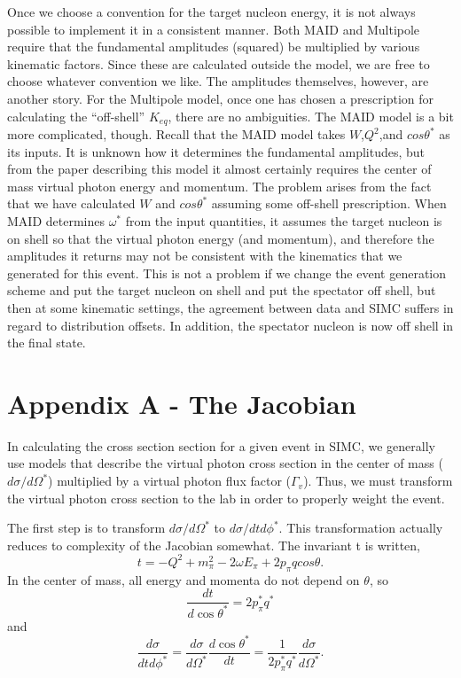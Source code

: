 Once we choose a convention for the target nucleon energy, it is not always 
possible to implement it in a consistent manner.  Both MAID and Multipole
require that the fundamental amplitudes (squared) be multiplied by various
kinematic factors.  Since these are calculated outside the model, we are free
to choose whatever convention we like.  The amplitudes themselves, however,
are another story. 
For the Multipole model, once one has chosen a prescription
for calculating the ``off-shell'' $K_{eq}$, there are no ambiguities.  The 
MAID model is a bit more complicated, though.  Recall that the MAID model 
takes $W$,$Q^2$,and $cos{\theta^*}$ as its inputs.  It is unknown how it 
determines the fundamental amplitudes, but from the paper describing this 
model it almost certainly requires the center of mass virtual photon energy 
and momentum.  The 
problem arises from the fact that we have calculated $W$ and $cos{\theta^*}$
assuming some off-shell prescription.  When MAID determines $\omega^*$ 
from the input quantities, it assumes the target nucleon is on shell so that 
the virtual photon energy (and momentum), and therefore the
amplitudes it returns may not be consistent with the kinematics that we 
generated for this event.  This is not a problem if we change the event 
generation scheme and put the target nucleon on shell and put the spectator 
off shell, but then at some kinematic settings, the agreement between data and
SIMC suffers in regard to distribution offsets.  In addition, the spectator 
nucleon is now off shell in the final state.

\section{Appendix A - The Jacobian}
In calculating the cross section section for a given event in SIMC, we 
generally use models that describe the virtual photon cross section in the
center of mass ($d\sigma/d\Omega^*$) multiplied by a virtual photon flux factor
($\Gamma_v$).  Thus, we must transform the virtual photon cross section to the
lab in order to properly weight the event.

The first step is to transform $d\sigma/d\Omega^*$ to $d\sigma/dtd\phi^*$.  
This transformation actually reduces to complexity of the Jacobian somewhat.
The invariant t is written,
$$
t = -Q^2 + m_{\pi}^2 - 2\omega E_{\pi} + 2p_{\pi}qcos{\theta}.
$$
In the center of mass, all energy and momenta do not depend on $\theta$, so
$$
\frac{dt}{d\cos{\theta^*}} = 2p_{\pi}^*q^*
$$
and
$$
\frac{d\sigma}{dtd\phi^*} = \frac{d\sigma}{d\Omega^*}\frac{d\cos{\theta^*}}{dt}
= \frac{1}{2p_{\pi}^*q^*} \frac{d\sigma}{d\Omega^*}.
$$


